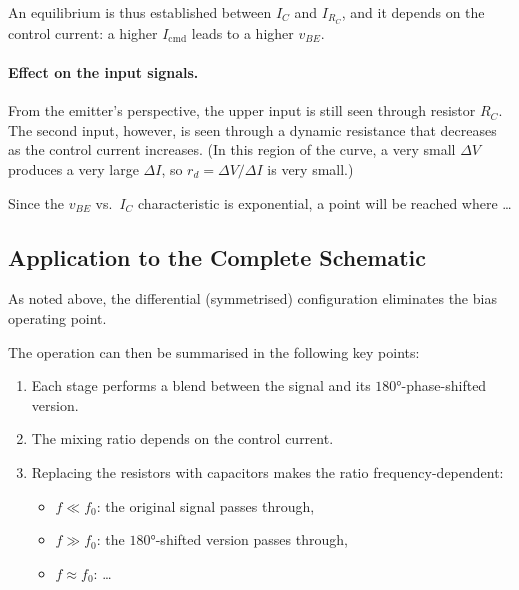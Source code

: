 \documentclass[10pt]{article}
\begin{document}
An equilibrium is thus established between $I_C$ and $I_{R_C}$, and it depends on the control current:
a higher $I_\mathrm{cmd}$ leads to a higher $v_{BE}$.

\paragraph{Effect on the input signals.}
From the emitter's perspective, the upper input is still seen through resistor $R_C$.
The second input, however, is seen through a dynamic resistance that decreases as the control current increases.
(In this region of the curve, a very small $\Delta V$ produces a very large $\Delta I$, so $r_d = \Delta V / \Delta I$ is very small.)

Since the $v_{BE}$ vs.\ $I_C$ characteristic is exponential, a point will be reached where \ldots


\subsection*{Application to the Complete Schematic}

As noted above, the differential (symmetrised) configuration eliminates the bias operating point.

The operation can then be summarised in the following key points:
\begin{enumerate}
  \item Each stage performs a blend between the signal and its $180°$-phase-shifted version.
  \item The mixing ratio depends on the control current.
  \item Replacing the resistors with capacitors makes the ratio frequency-dependent:
    \begin{itemize}
      \item $f \ll f_0$: the original signal passes through,
      \item $f \gg f_0$: the $180°$-shifted version passes through,
      \item $f \approx f_0$: \ldots
    \end{itemize}
\end{enumerate}
\end{document}
